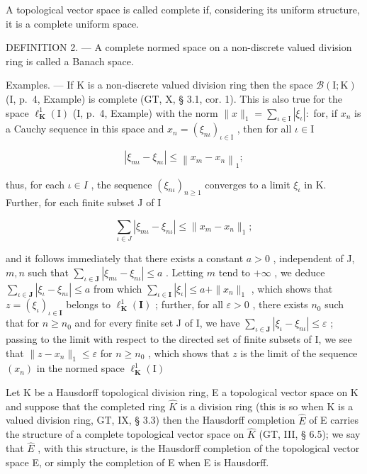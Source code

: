 A topological vector space is called complete if, considering its uniform structure, it is a complete uniform space.

DEFINITION 2. --- A complete normed space on a non-discrete valued division ring is called a Banach space.

Examples. --- If K is a non-discrete valued division ring then the space \(\mathcal{B}(\mathrm{I};\mathrm{K})\) (I, p.~4, Example) is complete (GT, X, § 3.1, cor. 1). This is also true for the space \(\ell_{\mathbf{K}}^{1}(\mathrm{I})\) (I, p.~4, Example) with the norm \(\| x\| _1 = \sum_{\iota \in \mathrm{I}}|\xi_\iota |:\) for, if \(x_{n}\) is a Cauchy sequence in this space and \(x_{n} = (\xi_{n\iota})_{\iota \in \mathrm{I}}\) , then for all \(\iota \in \mathrm{I}\)

\[
\left| \xi_ {m\iota} - \xi_ {n\iota} \right| \leqslant \left\| x _ {m} - x _ {n} \right\| _ {1};
\]

thus, for each \(\iota \in I\) , the sequence \((\xi_{n\iota})_{n\geqslant 1}\) converges to a limit \(\xi_{\iota}\) in K. Further, for each finite subset J of I

\[
\sum_ {\iota \in J} | \xi_ {m\iota} - \xi_ {n\iota} | \leqslant \| x _ {m} - x _ {n} \| _ {1};
\]

and it follows immediately that there exists a constant \(a > 0\) , independent of J, \(m, n\) such that \(\sum_{\iota \in \mathbf{J}} |\xi_{m\iota} - \xi_{n\iota}| \leqslant a\) . Letting \(m\) tend to \(+\infty\) , we deduce \(\sum_{\iota \in \mathbf{J}} |\xi_{\iota} - \xi_{n\iota}| \leqslant a\) from which \(\sum_{\iota \in \mathbf{I}} |\xi_{\iota}| \leqslant a + \| x_n\|_1\) , which shows that \(z = (\xi_{\iota})_{\iota \in \mathbf{I}}\) belongs to \(\ell_{\mathbf{K}}^1 (\mathbf{I})\) ; further, for all \(\varepsilon > 0\) , there exists \(n_0\) such that for \(n \geqslant n_0\) and for every finite set J of I, we have \(\sum_{\iota \in \mathbf{J}} |\xi_{\iota} - \xi_{n\iota}| \leqslant \varepsilon\) ; passing to the limit with respect to the directed set of finite subsets of I, we see that \(\| z - x_n\| _1\leqslant \varepsilon\) for \(n\geqslant n_0\) , which shows that \(z\) is the limit of the sequence \((x_{n})\) in the normed space \(\ell_{\mathbf{K}}^{1}(\mathrm{I})\)

Let K be a Hausdorff topological division ring, E a topological vector space on K and suppose that the completed ring \(\hat{K}\) is a division ring (this is so when K is a valued division ring, GT, IX, § 3.3) then the Hausdorff completion \(\hat{E}\) of E carries the structure of a complete topological vector space on \(\hat{K}\) (GT, III, § 6.5); we say that \(\hat{E}\) , with this structure, is the Hausdorff completion of the topological vector space E, or simply the completion of E when E is Hausdorff.

